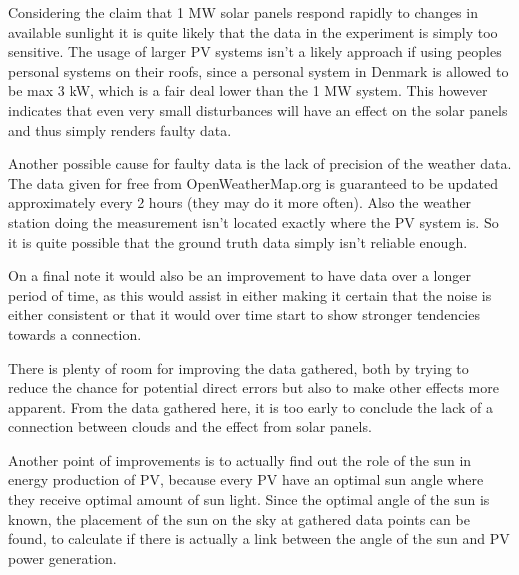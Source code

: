 Considering the claim that 1 MW solar panels respond rapidly to
changes in available sunlight \citep{cloudTrack} it is quite likely
that the data in the experiment is simply too sensitive.
The usage of larger PV systems isn't a likely approach if using
peoples personal systems on their roofs, since a personal system in
Denmark is allowed to be max 3 kW, which is a fair deal lower than the
1 MW system.  This however indicates that even very small disturbances
will have an effect on the solar panels and thus simply renders faulty
data.

Another possible cause for faulty data is the lack of precision of the
weather data.  The data given for free from OpenWeatherMap.org is
guaranteed to be updated approximately every 2 hours (they may do it
more often).  Also the weather station doing the measurement isn't
located exactly where the PV system is.  So it is quite possible that
the ground truth data simply isn't reliable enough.

On a final note it would also be an improvement to have data over a
longer period of time, as this would assist in either making it
certain that the noise is either consistent or that it would over time
start to show stronger tendencies towards a connection.

There is plenty of room for improving the data gathered, both by
trying to reduce the chance for potential direct errors but also to
make other effects more apparent.  From the data gathered here, it is too
early to conclude the lack of a connection between clouds and the
effect from solar panels.

Another point of improvements is to actually find out the role of the sun in energy production of PV, because every PV have an optimal sun angle where they receive optimal amount of sun light.  Since the optimal angle of the sun is known, the placement of the sun on the sky at gathered data points can be found, to calculate if there is actually a link between the angle of the sun and PV power generation.

